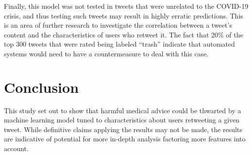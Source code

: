 \documentclass[conference]{IEEEtran}
\begin{document}
Finally, this model was not tested in tweets that were unrelated
to the COVID-19 crisis, and thus testing such tweets may result
in highly erratic predictions.  This is an area of further
research to investigate the correlation between a tweet's content
and the characteristics of users who retweet it. The fact that
20\% of the top 300 tweets that were rated being labeled
``trash'' indicate that automated systems would need to have a
countermeasure to deal with this case.

\section{Conclusion}

This study set out to show that harmful medical advice could be
thwarted by a machine learning model tuned to characteristics
about users retweeting a given tweet. While definitive claims
applying the results may not be made, the results are indicative
of potential for more in-depth analysis factoring more features
into account.

\vspace{12pt}



\end{document}
